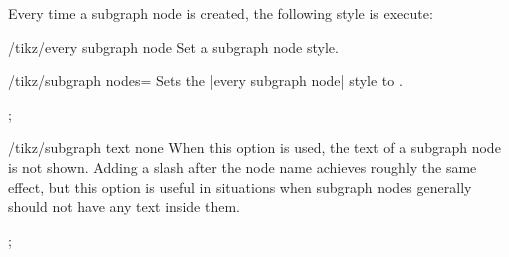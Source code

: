 Every time a subgraph node is created, the  following style is execute: 

\begin{key}{/tikz/every subgraph node}
  Set a subgraph node style.
\end{key}

\begin{key}{/tikz/subgraph nodes=}
  Sets the |every subgraph node| style to .
\begin{codeexample}[] 
\tikz [subgraph text bottom=text centered,
       subgraph nodes=red]
  ;
\end{codeexample}  
\end{key}

\begin{key}{/tikz/subgraph text none}
  When this option is used, the text of a subgraph node is not
  shown. Adding a slash after the node name achieves roughly the same
  effect, but this option is useful in situations when subgraph nodes
  generally should not have any text inside them.
\begin{codeexample}[] 
  ;
\end{codeexample}  

\end{key}

